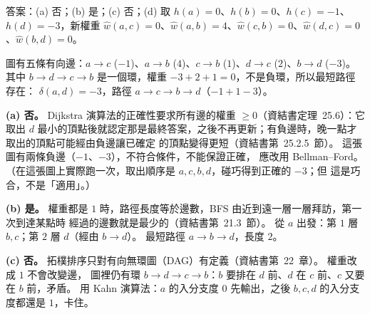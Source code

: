 \begin{pastsoln}
答案：(a) 否；(b) 是；(c) 否；(d) 取 $h(a) = 0$、$h(b) = 0$、$h(c) = -1$、$h(d) = -3$，新權重
$\hat w(a, c) = 0$、$\hat w(a, b) = 4$、$\hat w(c, b) = 0$、$\hat w(d, c) = 0$、$\hat w(b, d) = 0$。

圖有五條有向邊：$a \to c$ ($-1$)、$a \to b$ ($4$)、$c \to b$ ($1$)、$d \to c$ ($2$)、$b \to d$ ($-3$)。
其中 $b \to d \to c \to b$ 是一個環，權重 $-3 + 2 + 1 = 0$，不是負環，所以最短路徑存在：
$\delta(a, d) = -3$，路徑 $a \to c \to b \to d$（$-1 + 1 - 3$）。

\textbf{(a) 否。} Dijkstra 演算法的正確性要求所有邊的權重 $\ge 0$（資結書定理~25.6）：它取出 $d$
最小的頂點後就認定那是最終答案，之後不再更新；有負邊時，晚一點才取出的頂點可能經由負邊讓已確定
的頂點變得更短（資結書第~25.2.5~節）。 這張圖有兩條負邊（$-1$、$-3$），不符合條件，不能保證正確，
應改用 Bellman--Ford。 （在這張圖上實際跑一次，取出順序是 $a, c, b, d$，碰巧得到正確的 $-3$；但
這是巧合，不是「適用」。）

\textbf{(b) 是。} 權重都是 $1$ 時，路徑長度等於邊數，BFS 由近到遠一層一層拜訪，第一次到達某點時
經過的邊數就是最少的（資結書第~21.3~節）。 從 $a$ 出發：第 $1$ 層 $b, c$；第 $2$ 層 $d$（經由
$b \to d$）。 最短路徑 $a \to b \to d$，長度 $2$。

\textbf{(c) 否。} 拓樸排序只對有向無環圖（DAG）有定義（資結書第~22~章）。 權重改成 $1$ 不會改變邊，
圖裡仍有環 $b \to d \to c \to b$：$b$ 要排在 $d$ 前、$d$ 在 $c$ 前、$c$ 又要在 $b$ 前，矛盾。 用 Kahn
演算法：$a$ 的入分支度 $0$ 先輸出，之後 $b, c, d$ 的入分支度都還是 $1$，卡住。


\end{pastsoln}
